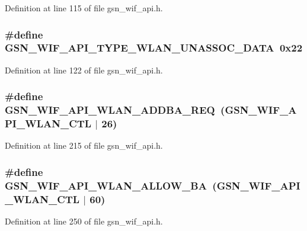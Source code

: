 Definition at line 115 of file gsn\_\-wif\_\-api.h.

\hypertarget{a00606_a128a138e12d8546c58af101ae73dafc9}{
\subsubsection[{GSN\_\-WIF\_\-API\_\-TYPE\_\-WLAN\_\-UNASSOC\_\-DATA}]{\setlength{\rightskip}{0pt plus 5cm}\#define GSN\_\-WIF\_\-API\_\-TYPE\_\-WLAN\_\-UNASSOC\_\-DATA~0x22}}
\label{a00606_a128a138e12d8546c58af101ae73dafc9}


Definition at line 122 of file gsn\_\-wif\_\-api.h.

\hypertarget{a00606_a9109b912102b7d0b17a14b970ed407e1}{
\subsubsection[{GSN\_\-WIF\_\-API\_\-WLAN\_\-ADDBA\_\-REQ}]{\setlength{\rightskip}{0pt plus 5cm}\#define GSN\_\-WIF\_\-API\_\-WLAN\_\-ADDBA\_\-REQ~(GSN\_\-WIF\_\-API\_\-WLAN\_\-CTL $|$ 26)}}
\label{a00606_a9109b912102b7d0b17a14b970ed407e1}


Definition at line 215 of file gsn\_\-wif\_\-api.h.

\hypertarget{a00606_a37da2db2071463c312f9e5013115c8c6}{
\subsubsection[{GSN\_\-WIF\_\-API\_\-WLAN\_\-ALLOW\_\-BA}]{\setlength{\rightskip}{0pt plus 5cm}\#define GSN\_\-WIF\_\-API\_\-WLAN\_\-ALLOW\_\-BA~(GSN\_\-WIF\_\-API\_\-WLAN\_\-CTL $|$ 60)}}
\label{a00606_a37da2db2071463c312f9e5013115c8c6}


Definition at line 250 of file gsn\_\-wif\_\-api.h.

